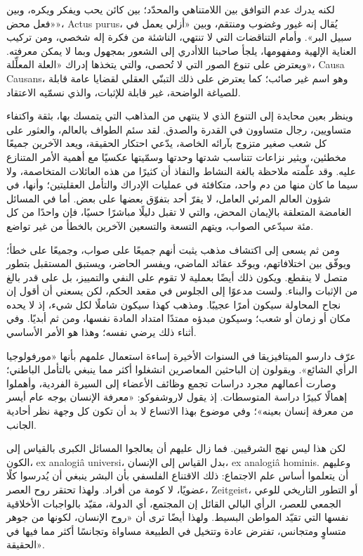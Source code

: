 لكنه يدرك عدم التوافق بين اللامتناهي والمحدّد؛ بين كائن يحب ويفكر ويكره، وبين «فعل محض»، \textenglish{Actus purus}، يُقال إنه غيور وغضوب ومنتقم، وبين «أزلي يعمل في سبيل البر». وأمام التناقضات التي لا تنتهي، الناشئة من فكرة إله شخصي، ومن تركيب العناية الإلهية ومفهومها، يلجأ صاحبنا اللاأدري إلى الشعور بمجهول وبما لا يمكن معرفته. ويعترض على تنوع الصور التي لا تُحصى، والتي يتخذها إدراك «العلة المعلِّلة»، \textenglish{Causa Causans}، وهو اسم غير صائب؛ كما يعترض على ذلك التبنّي العقلي لقضايا عامة قابلة للصياغة الواضحة، غير قابلة للإثبات، والذي نسمّيه الاعتقاد.

وينظر بعين محايدة إلى التنوع الذي لا ينتهي من المذاهب التي يتمسك بها، بثقة واكتفاء متساويين، رجال متساوون في القدرة والصدق. لقد سئم الطواف بالعالم، والعثور على كل شعب صغير متزوج بآرائه الخاصة، يدّعي احتكار الحقيقة، ويعد الآخرين جميعًا مخطئين، ويثير نزاعات تتناسب شدتها وحدتها وسمّيتها عكسيًا مع أهمية الأمر المتنازع عليه. وقد علّمته ملاحظة بالغة النشاط والنفاذ أن كثيرًا من هذه العائلات المتخاصمة، ولا سيما ما كان منها من دم واحد، متكافئة في عمليات الإدراك والتأمل العقليتين؛ وأنها، في شؤون العالم المرئي العامل، لا يقرّ أحد بتفوّق بعضها على بعض. أما في المسائل الغامضة المتعلقة بالإيمان المحض، والتي لا تقبل دليلًا مباشرًا حسيًا، فإن واحدًا من كل مئة سيدّعي الصواب، ويتهم التسعة والتسعين الآخرين بالخطأ من غير تواضع.

ومن ثم يسعى إلى اكتشاف مذهب يثبت أنهم جميعًا على صواب، وجميعًا على خطأ؛ ويوفّق بين اختلافاتهم، ويوحّد عقائد الماضي، ويفسر الحاضر، ويستبق المستقبل بتطور متصل لا ينقطع. ويكون ذلك أيضًا بعملية لا تقوم على النفي والتمييز، بل على قدر بالغ من الإثبات والبناء. ولست مدعوًا إلى الجلوس في مقعد الحكم، لكن يسعني أن أقول إن نجاح المحاولة سيكون أمرًا عجيبًا. ومذهب كهذا سيكون شاملًا لكل شيء، إذ لا يحده مكان أو زمان أو شعب؛ وسيكون مبدؤه ممتدًا امتداد المادة نفسها، ومن ثم أبديًا. وفي أثناء ذلك يرضي نفسه؛ وهذا هو الأمر الأساسي.

عرّف دارسو الميتافيزيقا في السنوات الأخيرة إساءة استعمال علمهم بأنها «مورفولوجيا الرأي الشائع». ويقولون إن الباحثين المعاصرين انشغلوا أكثر مما ينبغي بالتأمل الباطني؛ وصارت أعمالهم مجرد دراسات تجمع وظائف الأعضاء إلى السيرة الفردية، وأهملوا إهمالًا كبيرًا دراسة المتوسطات. إذ يقول لاروشفوكو: «معرفة الإنسان بوجه عام أيسر من معرفة إنسان بعينه»؛ وفي موضوع بهذا الاتساع لا بد أن تكون كل وجهة نظر أحادية الجانب.

لكن هذا ليس نهج الشرقيين. فما زال عليهم أن يعالجوا المسائل الكبرى بالقياس إلى الكون، \textenglish{ex analogiâ universi}، بدل القياس إلى الإنسان، \textenglish{ex analogiâ hominis}. وعليهم أن يتعلموا أساس علم الاجتماع: ذلك الاقتناع الفلسفي بأن البشر ينبغي أن يُدرسوا كلًا عضويًا، لا كومة من أفراد. ولهذا تحتقر روح العصر، \textenglish{Zeitgeist}، أو التطور التاريخي للوعي الجمعي للعصر، الرأي البالي القائل إن المجتمع، أي الدولة، مقيّد بالواجبات الأخلاقية نفسها التي تقيّد المواطن البسيط. ولهذا أيضًا ترى أن «روح الإنسان، لكونها من جوهر متساوٍ ومتجانس، تفترض عادة وتتخيل في الطبيعة مساواة وتجانسًا أكثر مما فيها في الحقيقة».

